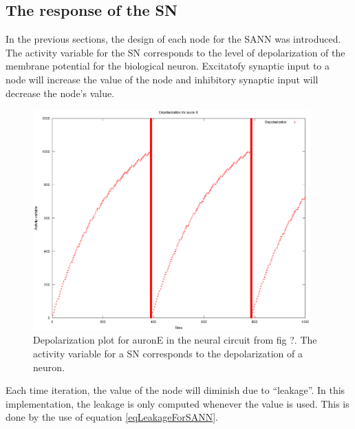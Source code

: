 \subsection{The response of the SN}
	In the previous sections, the design of each node for the SANN was introduced.
	The activity variable for the SN corresponds to the level of depolarization of the membrane potential for the biological neuron.
	Excitatofy synaptic input to a node will increase the value of the node and inhibitory synaptic input will decrease the node's value.

	\begin{figure}[hb!tp]
		\centering
		\includegraphics[width=0.95\textwidth]{depolPlotAvSN/eps_auronE-depol.eps}
		\caption{Depolarization plot for auronE in the neural circuit from fig ?. The activity variable for a SN corresponds to the depolarization of a neuron.} %
		\label{figAuronE}
	\end{figure}

	Each time iteration, the value of the node will diminish due to ``leakage''. 
	In this implementation, the leakage is only computed whenever the value is used.
	This is done by the use of equation \eqref{eqLeakageForSANN}.

